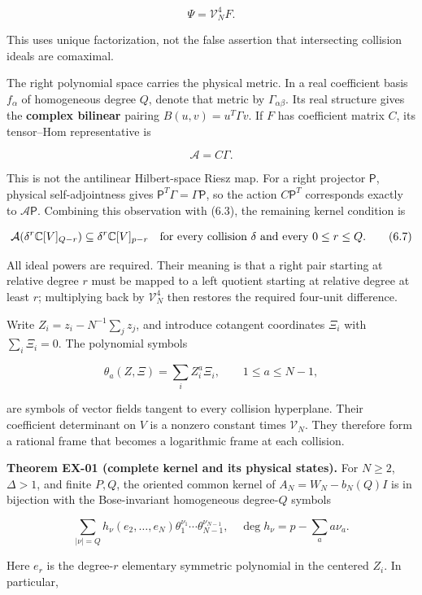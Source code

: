 \[
\Psi=\mathcal V_N^4F.
\tag{6.5}
\]

This uses unique factorization, not the false assertion that intersecting collision ideals are comaximal.

The right polynomial space carries the physical metric. In a real coefficient basis \(f_\alpha\) of homogeneous degree \(Q\), denote that metric by \(\Gamma_{\alpha\beta}\). Its real structure gives the \textbf{complex bilinear} pairing \(B(u,v)=u^T\Gamma v\). If \(F\) has coefficient matrix \(C\), its tensor--Hom representative is

\[
\mathcal A=C\Gamma.
\tag{6.6}
\]

This is not the antilinear Hilbert-space Riesz map. For a right projector \(\mathsf P\), physical self-adjointness gives \(\mathsf P^T\Gamma=\Gamma\mathsf P\), so the action \(C\mathsf P^T\) corresponds exactly to \(\mathcal A\mathsf P\). Combining this observation with (6.3), the remaining kernel condition is

\[
\mathcal A\!\left(\delta^r\mathbb C[V]_{Q-r}\right)
\subseteq\delta^r\mathbb C[V]_{p-r}
\quad\hbox{for every collision }\delta
\hbox{ and every }0\le r\le Q.
\tag{6.7}
\]

All ideal powers are required. Their meaning is that a right pair starting at relative degree \(r\) must be mapped to a left quotient starting at relative degree at least \(r\); multiplying back by \(\mathcal V_N^4\) then restores the required four-unit difference.

Write \(Z_i=z_i-N^{-1}\sum_jz_j\), and introduce cotangent coordinates \(\Xi_i\) with \(\sum_i\Xi_i=0\). The polynomial symbols

\[
\theta_a(Z,\Xi)=\sum_i Z_i^a\Xi_i,
\qquad 1\le a\le N-1,
\tag{6.8}
\]

are symbols of vector fields tangent to every collision hyperplane. Their coefficient determinant on \(V\) is a nonzero constant times \(\mathcal V_N\). They therefore form a rational frame that becomes a logarithmic frame at each collision.

\textbf{Theorem EX-01 (complete kernel and its physical states).} For \(N\ge2\), \(\Delta>1\), and finite \(P,Q\), the oriented common kernel of \(A_N=W_N-b_N(Q)I\) is in bijection with the Bose-invariant homogeneous degree-\(Q\) symbols

\[
\sum_{|\nu|=Q}h_\nu(e_2,\ldots,e_N)\theta_1^{\nu_1}\cdots\theta_{N-1}^{\nu_{N-1}},
\quad
\deg h_\nu=p-\sum_a a\nu_a.
\tag{6.9}
\]

Here \(e_r\) is the degree-\(r\) elementary symmetric polynomial in the centered \(Z_i\). In particular,

